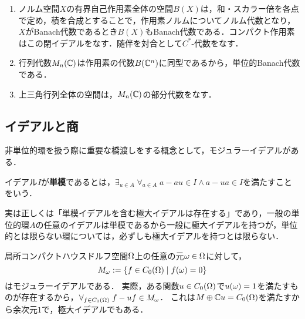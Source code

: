 \documentclass[uplatex,dvipdfmx]{jsreport}
\begin{document}
\begin{example}[Banの内部ホム]\mbox{}
    \begin{enumerate}
        \item ノルム空間$X$の有界自己作用素全体の空間$B(X)$は，和・スカラー倍を各点で定め，積を合成とすることで，作用素ノルムについてノルム代数となり，$X$がBanach代数であるとき$B(X)$もBanach代数である．コンパクト作用素はこの閉イデアルをなす．随伴を対合として$C^*$-代数をなす．
        \item 行列代数$M_n(\mathbb{C})$は作用素の代数$B(\mathbb{C}^n)$に同型であるから，単位的Banach代数である．
        \item 上三角行列全体の空間は，$M_n(\mathbb{C})$の部分代数をなす．
    \end{enumerate}
\end{example}



\subsection{イデアルと商}

\begin{tcolorbox}[colframe=ForestGreen, colback=ForestGreen!10!white,breakable,colbacktitle=ForestGreen!40!white,coltitle=black,fonttitle=\bfseries\sffamily,
title=]
    非単位的環を扱う際に重要な橋渡しをする概念として，モジュラーイデアルがある．
\end{tcolorbox}

\begin{definition}
    イデアル$I$が\textbf{単模}であるとは，$\exists_{u\in A}\;\forall_{a\in A}\;a-au\in I\land a-ua\in I$を満たすことをいう．
\end{definition}
\begin{remarks}
    実は正しくは「単模イデアルを含む極大イデアルは存在する」であり，一般の単位的環$A$の任意のイデアルは単模であるから一般に極大イデアルを持つが，単位的とは限らない環については，必ずしも極大イデアルを持つとは限らない．
\end{remarks}

\begin{example}
    局所コンパクトハウスドルフ空間$\Omega$上の任意の元$\omega\in\Omega$に対して，
    \[M_\omega:=\left\{f\in C_0(\Omega)\mid f(\omega)=0\right\}\]
    はモジュラーイデアルである．
    実際，ある関数$u\in C_0(\Omega)$で$u(\omega)=1$を満たすものが存在するから，$\forall_{f\in C_0(\Omega)}\;f-uf\in M_\omega$．
    これは$M\oplus \mathbb{C} u=C_0(\Omega)$を満たすから余次元$1$で，極大イデアルでもある．
\end{example}
\end{document}
